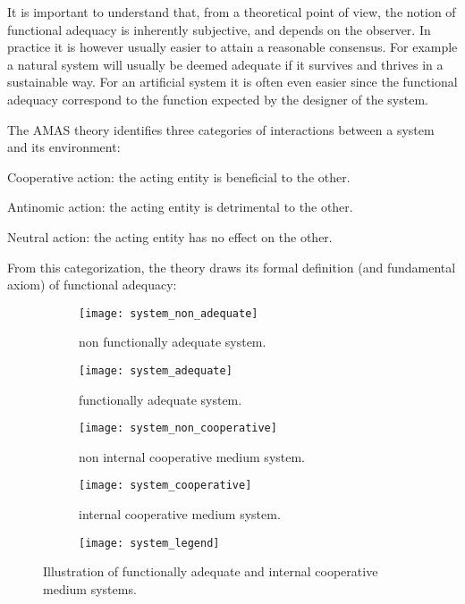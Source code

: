 It is important to understand that, from a theoretical point of view, the notion of functional adequacy is inherently subjective, and depends on the observer. In practice it is however usually easier to attain a reasonable consensus. For example a natural system will usually be deemed adequate if it survives and thrives in a sustainable way. For an artificial system it is often even easier since the functional adequacy correspond to the function expected by the designer of the system.

The AMAS theory identifies three categories of interactions between a system and its environment:
\begin{compactitem}
\item Cooperative action: the acting entity is beneficial to the other.
\item Antinomic action: the acting entity is detrimental to the other.
\item Neutral action: the acting entity has no effect on the other.
\end{compactitem}

From this categorization, the theory draws its formal definition (and fundamental axiom) of functional adequacy:


\begin{figure}
\centering

	\begin{subfigure}[b]{0.45\textwidth}
		\centering
		\texttt{[image: system\_non\_adequate]}
		\caption{non functionally adequate system.}\label{adequacy_comp_1}
	\end{subfigure}
	\begin{subfigure}[b]{0.45\textwidth}
		\centering
		\texttt{[image: system\_adequate]}
		\caption{functionally adequate system.}\label{adequacy_comp_2}
	\end{subfigure}
	
	\begin{subfigure}[b]{0.45\textwidth}
		\centering
		\texttt{[image: system\_non\_cooperative]}
		\caption{non internal cooperative medium system.}\label{internal_cooperative_comp_1}
	\end{subfigure}
	\begin{subfigure}[b]{0.45\textwidth}
		\centering
		\texttt{[image: system\_cooperative]}
		\caption{internal cooperative medium system.}\label{internal_cooperative_comp_2}
	\end{subfigure}
	
	\begin{subfigure}[b]{0.7\textwidth}
		\centering
		\texttt{[image: system\_legend]}
	\end{subfigure}
	
\caption{Illustration of functionally adequate  and internal cooperative medium systems.}
\label{adequacy_comp}
\end{figure}

